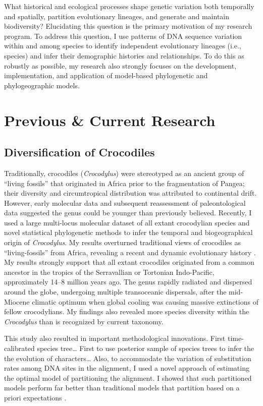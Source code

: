 \documentclass[10pt]{article}
\begin{document}
\raggedright
\singlespacing

What historical and ecological processes shape genetic variation both temporally and spatially, partition evolutionary lineages, and generate and maintain biodiversity?
Elucidating this question is the primary motivation of my research program.
To address this question, I use patterns of DNA sequence variation within and among species to identify independent evolutionary lineages (i.e., species) and infer their demographic histories and relationships.
To do this as robustly as possible, my research also strongly focuses on the development, implementation, and application of model-based phylogenetic and phylogeographic models.

\section*{Previous \& Current Research}
\subsection*{Diversification of Crocodiles}
Traditionally, crocodiles (\emph{Crocodylus}) were stereotyped as an ancient group of ``living fossils'' that originated in Africa prior to the fragmentation of Pangea; their diversity and circumtropical distribution was attributed to continental drift.
However, early molecular data and subsequent reassessment of paleontological data suggested the genus could be younger than previously believed.
Recently, I used a large multi-locus molecular dataset of all extant crocodylian species and novel statistical phylogenetic methods to infer the temporal and biogeographical origin of \emph{Crocodylus}.
My results overturned traditional views of crocodiles as ``living-fossils'' from Africa, revealing a recent and dynamic evolutionary history \cite{Oaks2011}.
My results strongly support that all extant crocodiles originated from a common ancestor in the tropics of the Serravallian or Tortonian Indo-Pacific, approximately 14--8 million years ago.
The genus rapidly radiated and dispersed around the globe, undergoing multiple transoceanic dispersals, after the mid-Miocene climatic optimum when global cooling was causing massive extinctions of fellow crocodylians.
My findings also revealed more species diversity within the \emph{Crocodylus} than is recognized by current taxonomy.

This study also resulted in important methodological innovations.
First time-calibrated species tree\ldots
First to use posterior sample of species trees to infer the the evolution of characters\ldots
Also, to accommodate the variation of substitution rates among DNA sites in the alignment, I used a novel approach of estimating the optimal model of partitioning the alignment.
I showed that such partitioned models perform far better than traditional models that partition based on a priori expectations \cite{OaksInPrep}.
\end{document}
